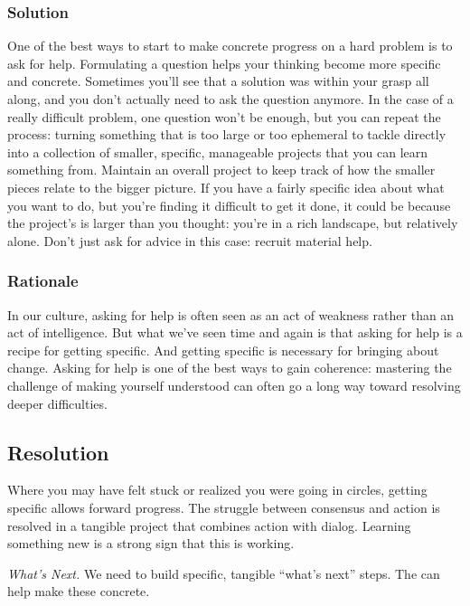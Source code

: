 \subsubsection*{Solution} 
One of the best ways to start to make concrete progress on a hard problem is to ask for help.   Formulating a question helps your thinking become more specific and concrete.  Sometimes you'll see that a solution was within your grasp all along, and you don't actually need to ask the question anymore.  In the case of a really difficult problem, one question won't be enough, but you can repeat the process: turning something that is too large or too ephemeral to tackle directly into a collection of smaller, specific, manageable projects that you can learn something from.  Maintain an overall project  to keep track of how the smaller pieces relate to the bigger picture.  If you have a fairly specific idea about what you want to do, but you're finding it difficult to get it done, it could be because the project's  is larger than you thought: you're in a rich landscape, but relatively alone.  Don't just ask for advice in this case: recruit material help.

\subsubsection*{Rationale} 
In our culture, asking for help is often seen as an act of weakness rather than an act of intelligence.
But what we've seen time and again is that asking for help is a recipe for getting specific.
And getting specific is necessary for bringing about change.  Asking for help is one
of the best ways to gain coherence: mastering the challenge of making yourself understood can often go a long way
toward resolving deeper difficulties.  

\subsection{Resolution}
Where you may have felt stuck or realized you were going in circles, getting specific allows forward progress.  The struggle between consensus and action is resolved in a tangible project that combines action with dialog.  Learning something new is a strong sign that this is working.

\begin{framed}
\emph{What's Next.}
We need to build specific, tangible ``what's next'' steps. The  can help make these concrete. 
\end{framed}

\endgroup
    
    
  
  
  
  